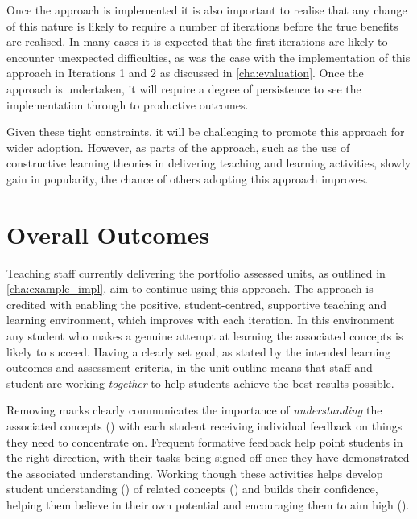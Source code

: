 Once the approach is implemented it is also important to realise that any change of this nature is likely to require a number of iterations before the true benefits are realised. In many cases it is expected that the first iterations are likely to encounter unexpected difficulties, as was the case with the implementation of this approach in Iterations 1 and 2 as discussed in \cref{cha:evaluation}. Once the approach is undertaken, it will require a degree of persistence to see the implementation through to productive outcomes. 

Given these tight constraints, it will be challenging to promote this approach for wider adoption. However, as parts of the approach, such as the use of constructive learning theories in delivering teaching and learning activities, slowly gain in popularity, the chance of others adopting this approach improves.






\section{Overall Outcomes} %
\label{sec:overall_outcomes}

Teaching staff currently delivering the portfolio assessed units, as outlined in \cref{cha:example_impl}, aim to continue using this approach. The approach is credited with enabling the positive, student-centred, supportive teaching and learning environment, which improves with each iteration. In this environment any student who makes a genuine attempt at learning the associated concepts is likely to succeed. Having a clearly set goal, as stated by the intended learning outcomes and assessment criteria, in the unit outline means that staff and student are working \emph{together} to help students achieve the best results possible.

Removing marks clearly communicates the importance of \emph{understanding} the associated concepts () with each student receiving individual feedback on things they need to concentrate on. Frequent formative feedback help point students in the right direction, with their tasks being signed off once they have demonstrated the associated understanding. Working though these activities helps develop student understanding () of related concepts () and builds their confidence, helping them believe in their own potential and encouraging them to aim high ().

